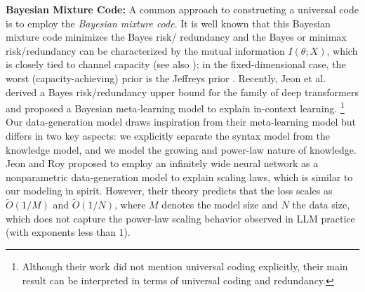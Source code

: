 \documentclass[11pt]{article}
\theoremstyle{plain}
\theoremstyle{definition}
\begin{document}
\vspace{0.1cm}
\noindent
{\bf Bayesian Mixture Code:}
A common approach to constructing a universal code is to employ the \emph{Bayesian mixture code}.
It is well known that this Bayesian mixture code minimizes the Bayes risk/ redundancy 
\citep{aitchison1975goodness} and the Bayes or minimax risk/redundancy can be characterized by the mutual information \(I(\theta; X)\), which is closely tied to channel capacity \citep{gallager1979source,cover2006elements}
(see also \citep{duchi2024lecture}); in the fixed-dimensional case, the worst (capacity-achieving) prior is the Jeffreys prior \citep{clarke1994jeffreys}. Recently, Jeon et al. \citep{jeoninformation} derived a Bayes risk/redundancy upper bound for the family of deep transformers and proposed a Bayesian meta-learning model to explain in-context learning.
\footnote{Although their work did not mention universal coding explicitly, 
their main result can be interpreted in terms of universal coding and redundancy.
}
Our data-generation model draws inspiration from their meta-learning model but differs in two key aspects: we explicitly separate the syntax model 
from the knowledge model, 
and we model the growing and power-law nature of knowledge. 
Jeon and Roy \citep{jeon2024information}
proposed to employ an infinitely wide neural network as a nonparametric data-generation model to explain scaling laws, which is similar to our modeling in spirit. However, their theory predicts that the loss scales as 
\(\widetilde{O}(1/M)\) and \(\widetilde{O}(1/N)\), where \(M\) denotes the model size and \(N\) the data size, which does not capture the power-law scaling behavior observed in LLM practice (with exponents less than 1).
\end{document}
